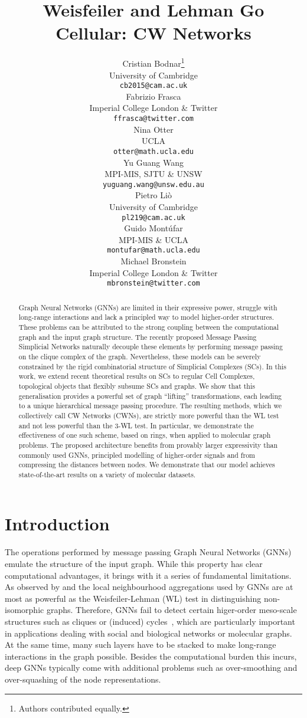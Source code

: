 \documentclass{article}
\title{Weisfeiler and Lehman Go Cellular: CW Networks}
\author{Cristian Bodnar\thanks{Authors contributed equally.}  \\
  University of Cambridge\\
  \texttt{cb2015@cam.ac.uk} \\
\And
   Fabrizio Frasca \\
   Imperial College London \& Twitter \\
\texttt{ffrasca@twitter.com} \\
   \AND
   Nina Otter \\
   UCLA \\
\texttt{otter@math.ucla.edu} \\
   \And
   Yu Guang Wang \\
   MPI-MIS, SJTU \& UNSW \\
\texttt{yuguang.wang@unsw.edu.au} \\
   \AND
   Pietro Li\`{o} \\
   University of Cambridge \\
\texttt{pl219@cam.ac.uk} \\
   \And
   Guido Mont\'{u}far \\
   MPI-MIS \& UCLA \\
   \texttt{montufar@math.ucla.edu} \\
   \And
   Michael Bronstein \\
   Imperial College London \& Twitter \\
   \texttt{mbronstein@twitter.com} \\
}
\begin{document}
\maketitle

\begin{abstract}
Graph Neural Networks (GNNs) are limited in their expressive power, struggle with long-range interactions and lack a principled way to model higher-order structures.
These problems can be attributed to the strong coupling between the computational graph and the input graph structure.
The recently proposed Message Passing Simplicial Networks naturally decouple these elements by performing message passing on the clique complex of the graph. Nevertheless, these models can be severely constrained by the rigid combinatorial structure of Simplicial Complexes (SCs). 
In this work, we extend recent theoretical results on SCs to regular Cell Complexes, topological objects that flexibly subsume SCs and graphs. 
We show that this generalisation provides a powerful set of graph ``lifting'' transformations, each leading to a unique hierarchical message passing procedure. The resulting methods, which we collectively call CW Networks (CWNs), are strictly more powerful than the WL test and not less powerful than the 3-WL test. In particular, we demonstrate the effectiveness of one such scheme, based on rings, when applied to molecular graph problems. The proposed architecture benefits from provably larger expressivity than commonly used GNNs, principled modelling of higher-order signals and from compressing the distances between nodes. We demonstrate that our model achieves state-of-the-art results on a variety of molecular datasets.
\end{abstract}


\section{Introduction}

The operations performed by message passing Graph Neural Networks (GNNs) emulate the structure of the input graph. While this property has clear computational advantages, it brings with it a series of fundamental limitations. As observed by \citet{GIN} and \citet{morris2019weisfeiler} the local neighbourhood aggregations used by GNNs are at most as powerful as the Weisfeiler-Lehman (WL) test \citep{weisfeiler1968reduction} in distinguishing non-isomorphic graphs. Therefore, GNNs fail to detect certain higer-order meso-scale structures such as cliques or (induced) cycles~\citep{ARVIND202042, chen2020can}, which are particularly important in applications dealing with social and biological networks or molecular graphs. At the same time, many such layers have to be stacked to make long-range interactions in the graph possible. Besides the computational burden this incurs, deep GNNs typically come with additional problems such as over-smoothing \citep{li2018deeper} and over-squashing \citep{alon2020bottleneck} of the node representations.  
\end{document}
